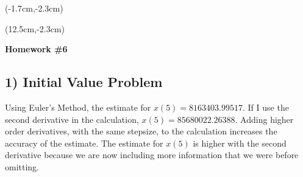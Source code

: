 \documentclass[12pt, oneside]{article}
\begin{document}
\begin{textblock*}{4cm}(-1.7cm,-2.3cm)
\end{textblock*}

\begin{textblock*}{8cm}(12.5cm,-2.3cm)
\end{textblock*}


\vspace{1cm}

\makeatletter
\setlength{\@fptop}{0pt}
\makeatother

\begin{center}
\textbf{\Large Homework \#6}
\end{center}


\subsection*{1) Initial Value Problem}
Using Euler's Method, the estimate for $x(5)=8163403.99517$. If I use the second derivative in the calculation, $x(5)=85680022.26388$. Adding higher order derivatives, with the same stepsize, to the calculation increases the accuracy of the estimate. The estimate for $x(5)$ is higher with the second derivative because we are now including more information that we were before omitting.
\end{document}
